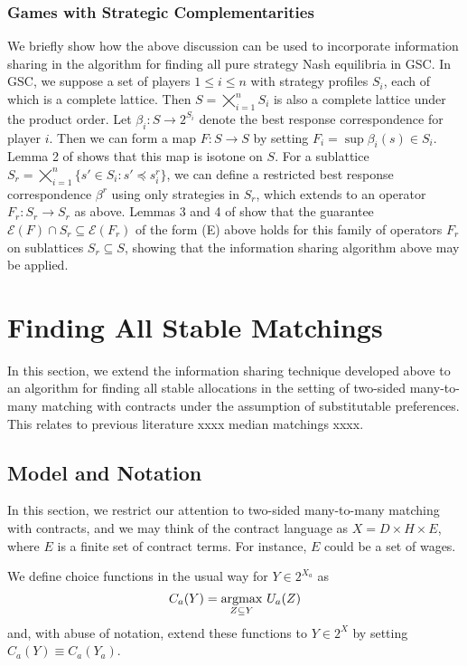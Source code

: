 \documentclass[11pt,reqno]{amsart}
\theoremstyle{definition}
\numberwithin{equation}{section}
\newcommand{\argmax}{\operatornamewithlimits{argmax}}
\newcommand{\sub}{\subseteq}
\newcommand{\fix}{\mathcal{E}}
\newcommand{\peq}{\preceq}
\newcommand{\oper}{F}
\begin{document}
\subsubsection{Games with Strategic Complementarities}
We briefly show how the above discussion can be used to incorporate information sharing in the \cite{Echenique2007Equilibria} algorithm for finding all pure strategy Nash equilibria in GSC. 
In GSC, we suppose a set of players $1 \leq i \leq n$ with strategy profiles $S_i$, each of which is a complete lattice.
Then $S = \bigtimes_{i = 1}^n S_i$ is also a complete lattice under the product order.
Let $\beta_i: S \to 2^{S_i}$ denote the best response correspondence for player $i$.
Then we can form a map $\oper: S \to S$ by setting $\oper_i = \sup \beta_i(s) \in S_i$.
Lemma 2 of \cite{Echenique2007Equilibria} shows that this map is isotone on $S$.
For a sublattice $S_r = \bigtimes_{i = 1}^n \{s' \in S_i: s' \peq s^r_i\}$, we can define a restricted best response correspondence $\beta^r$ using only strategies in $S_r$, which extends to an operator $\oper_r: S_r \to S_r$ as above.
Lemmas 3 and 4 of \cite{Echenique2007Equilibria} show that the guarantee $\fix(\oper) \cap S_r \sub \fix (F_r)$ of the form (E) above holds for this family of operators $\oper_r$ on sublattices $S_r \sub S$, showing that the information sharing algorithm above may be applied.

\section{Finding All Stable Matchings} 
In this section, we extend the information sharing technique developed above to an algorithm for finding all stable allocations in the setting of two-sided many-to-many matching with contracts under the assumption of substitutable preferences.
This relates to previous literature xxxx median matchings xxxx.

\subsection{Model and Notation} 
In this section, we restrict our attention to two-sided many-to-many matching with contracts, and we may think of the contract language as $X = D\times H \times E$, where $E$ is a finite set of contract terms. For instance, $E$ could be a set of wages.

We define choice functions in the usual way for $Y\in 2^{X_a}$ as 
\[
C_a(Y) = \argmax_{Z\subseteq Y} \, U_a(Z)
\]
and, with abuse of notation, extend these functions to $Y\in 2^X$ by setting $C_a(Y) \equiv C_a(Y_a)$.
\end{document}
